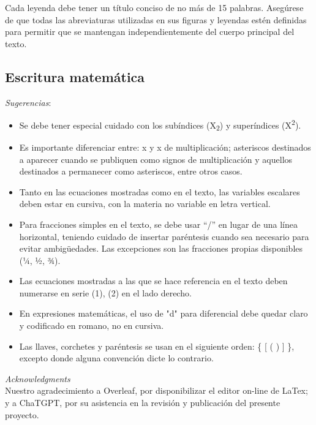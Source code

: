 \documentclass[a4paper,12pt]{article}
\begin{document}
Cada leyenda debe tener un título conciso de no más de 15 palabras. Asegúrese de que todas las abreviaturas utilizadas en sus figuras y leyendas estén deﬁnidas para permitir que se mantengan independientemente del cuerpo principal del texto.
\subsection{Escritura matemática} 
 
 \textit{Sugerencias}:

\begin{itemize}
    \item Se debe tener especial cuidado con los subíndices (X\textsubscript{2}) y superíndices (X\textsuperscript{2}).
    \item Es importante diferenciar entre:  x y x de multiplicación; asteriscos destinados a aparecer cuando se publiquen como signos de multiplicación y aquellos destinados a permanecer como asteriscos, entre otros casos.
    \item Tanto en las ecuaciones mostradas como en el texto, las variables escalares deben estar en cursiva, con la materia no variable en letra vertical.
    \item Para fracciones simples en el texto, se debe usar “/” en lugar de una línea horizontal, teniendo cuidado de insertar paréntesis cuando sea necesario para evitar ambigüedades. Las excepciones son las fracciones propias disponibles (¼, ½, ¾).
    \item Las ecuaciones mostradas a las que se hace referencia en el texto deben numerarse en serie (1), (2) en el lado derecho.
    \item En expresiones matemáticas, el uso de "d" para diferencial debe quedar claro y codificado en romano, no en cursiva.
    \item Las llaves, corchetes y paréntesis se usan en el siguiente orden: \{ [ ( ) ] \}, excepto donde alguna convención dicte lo contrario.
\end{itemize}

\textit{Acknowledgments} \\ Nuestro agradecimiento a Overleaf, por disponibilizar el editor on-line de LaTex; y a ChaTGPT, por su asistencia en la revisión y publicación del presente proyecto.
\end{document}
